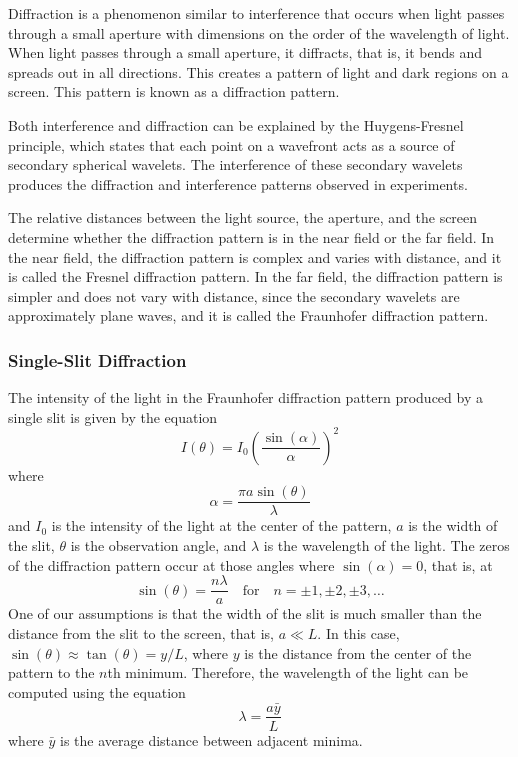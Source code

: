 \documentclass[10pt]{article}
\begin{document}
Diffraction is a phenomenon similar to interference that occurs when light passes through a small aperture with dimensions on the order of the wavelength of light. When light passes through a small aperture, it diffracts, that is, it bends and spreads out in all directions. This creates a pattern of light and dark regions on a screen. This pattern is known as a diffraction pattern.

Both interference and diffraction can be explained by the Huygens-Fresnel principle, which states that each point on a wavefront acts as a source of secondary spherical wavelets. The interference of these secondary wavelets produces the diffraction and interference patterns observed in experiments.

The relative distances between the light source, the aperture, and the screen determine whether the diffraction pattern is in the near field or the far field. In the near field, the diffraction pattern is complex and varies with distance, and it is called the Fresnel diffraction pattern. In the far field, the diffraction pattern is simpler and does not vary with distance, since the secondary wavelets are approximately plane waves, and it is called the Fraunhofer diffraction pattern.

\subsubsection*{Single-Slit Diffraction}

The intensity of the light in the Fraunhofer diffraction pattern produced by a single slit is given by the equation
\begin{equation}
  I(\theta) = I_0 \left( \frac{\sin(\alpha)}{\alpha} \right)^2
  \label{eq:single-slit-intensity}
\end{equation}
where
\begin{equation}
  \alpha = \frac{\pi a \sin(\theta)}{\lambda}
\end{equation}
and $I_0$ is the intensity of the light at the center of the pattern, $a$ is the width of the slit, $\theta$ is the observation angle, and $\lambda$ is the wavelength of the light. The zeros of the diffraction pattern occur at those angles where $\sin(\alpha) = 0$, that is, at
\begin{equation}
  \sin(\theta) = \frac{n \lambda}{a} \quad \text{for} \quad n = \pm 1, \pm 2, \pm 3, \ldots
\end{equation}
One of our assumptions is that the width of the slit is much smaller than the distance from the slit to the screen, that is, $a \ll L$. In this case, $\sin(\theta) \approx \tan(\theta) = y/L$, where $y$ is the distance from the center of the pattern to the $n$th minimum. Therefore, the wavelength of the light can be computed using the equation
\begin{equation}
  \lambda = \frac{a \bar{y}}{L}
\end{equation}
where $\bar{y}$ is the average distance between adjacent minima. 
\end{document}
